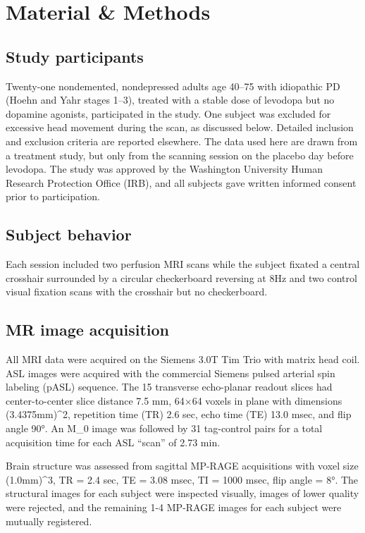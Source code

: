 \section{Material \& Methods}

\subsection{Study participants}
Twenty-one nondemented, nondepressed adults age 40–75 with idiopathic PD (Hoehn and Yahr stages 1–3),\cite{6067254} treated with a stable dose of levodopa but no dopamine agonists, participated in the study. One subject was excluded for excessive head movement during the scan, as discussed below. Detailed inclusion and exclusion criteria are reported elsewhere.\cite{Black_2010} The data used here are drawn from a treatment study,\cite{Black_2010} but only from the scanning session on the placebo day before levodopa. The study was approved by the Washington University Human Research Protection Office (IRB), and all subjects gave written informed consent prior to participation.  

\subsection{Subject behavior}
Each session included two perfusion MRI scans while the subject fixated a central crosshair surrounded by a circular checkerboard reversing at 8Hz and two control visual fixation scans with the crosshair but no checkerboard. 

\subsection{MR image acquisition}
All MRI data were acquired on the Siemens 3.0T Tim Trio with matrix head coil. ASL images were acquired with the commercial Siemens pulsed arterial spin labeling (pASL) sequence.\cite{Wang_2003} The 15 transverse echo-planar readout slices had center-to-center slice distance 7.5 mm, 64$\times$64 voxels in plane with dimensions (3.4375mm)^2, repetition time (TR) 2.6 sec, echo time (TE) 13.0 msec, and flip angle 90°. An M_0 image was followed by 31 tag-control pairs for a total acquisition time for each ASL ``scan'' of 2.73 min.

Brain structure was assessed from sagittal MP-RAGE acquisitions with voxel size (1.0mm)^3, TR = 2.4 sec, TE = 3.08 msec, TI = 1000 msec, flip angle = 8°. The structural images for each subject were inspected visually, images of lower quality were rejected, and the remaining 1-4 MP-RAGE images for each subject were mutually registered.


